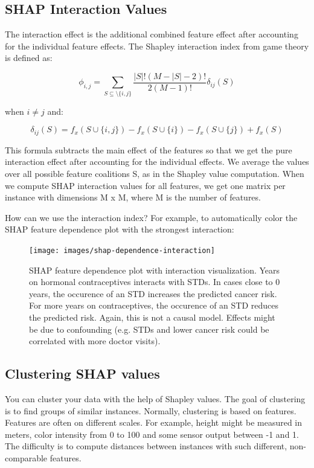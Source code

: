 \documentclass[
  12pt,
]{krantz}
\begin{document}
\hypertarget{shap-interaction-values}{%
\subsection{SHAP Interaction Values}\label{shap-interaction-values}}

The interaction effect is the additional combined feature effect after accounting for the individual feature effects.
The Shapley interaction index from game theory is defined as:

\[\phi_{i,j}=\sum_{S\subseteq\setminus\{i,j\}}\frac{|S|!(M-|S|-2)!}{2(M-1)!}\delta_{ij}(S)\]

when \(i\neq{}j\) and:

\[\delta_{ij}(S)=f_x(S\cup\{i,j\})-f_x(S\cup\{i\})-f_x(S\cup\{j\})+f_x(S)\]

This formula subtracts the main effect of the features so that we get the pure interaction effect after accounting for the individual effects.
We average the values over all possible feature coalitions S, as in the Shapley value computation.
When we compute SHAP interaction values for all features, we get one matrix per instance with dimensions M x M, where M is the number of features.

How can we use the interaction index?
For example, to automatically color the SHAP feature dependence plot with the strongest interaction:

\begin{figure}

{\centering \texttt{[image: images/shap-dependence-interaction]} 

}

\caption{SHAP feature dependence plot with interaction visualization. Years on hormonal contraceptives interacts with STDs. In cases close to 0 years, the occurence of an STD increases the predicted cancer risk. For more years on contraceptives, the occurence of an STD reduces the predicted risk. Again, this is not a causal model. Effects might be due to confounding (e.g. STDs and lower cancer risk could be correlated with more doctor visits).}\label{fig:unnamed-chunk-48}
\end{figure}

\hypertarget{clustering-shap-values}{%
\subsection{Clustering SHAP values}\label{clustering-shap-values}}

You can cluster your data with the help of Shapley values.
The goal of clustering is to find groups of similar instances.
Normally, clustering is based on features.
Features are often on different scales.
For example, height might be measured in meters, color intensity from 0 to 100 and some sensor output between -1 and 1.
The difficulty is to compute distances between instances with such different, non-comparable features.
\end{document}

